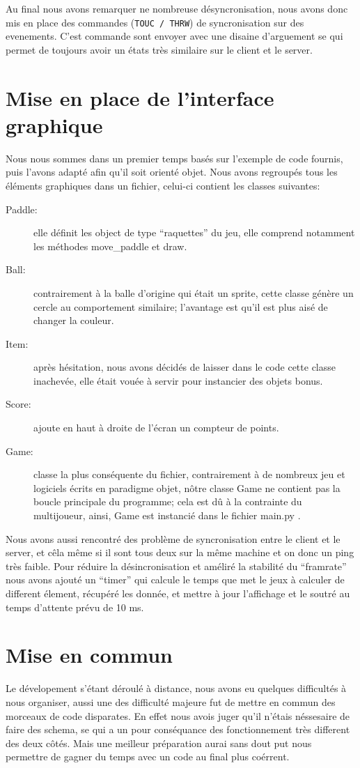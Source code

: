 \documentclass[12pt]{report}
\begin{document}
Au final nous avons remarquer ne nombreuse désyncronisation, nous avons donc
mis en place des commandes (\texttt{TOUC / THRW}) de syncronisation sur des
evenements.
C'est commande sont envoyer avec une disaine d'arguement se qui permet de toujours
avoir un états très similaire sur le client et le server.

\chapter{Mise en place de l'interface graphique}
Nous nous sommes dans un premier temps basés sur l'exemple de code
fournis, puis l'avons adapté afin qu'il soit orienté objet. Nous avons
regroupés tous les éléments graphiques dans un fichier, celui-ci
contient les classes suivantes:

\begin{description}
  \item [Paddle:] elle définit les object de type ``raquettes'' du jeu, elle
    comprend notamment les méthodes move_paddle et draw.
  \item [Ball:] contrairement à la balle d'origine qui était un
    sprite, cette classe génère un cercle au comportement similaire;
    l'avantage est qu'il est plus aisé de changer la couleur.
  \item [Item: ] après hésitation, nous avons décidés de laisser dans
    le code cette classe inachevée, elle était vouée à servir pour
    instancier des objets bonus.
  \item [Score: ] ajoute en haut à droite de l'écran un compteur de
    points.
  \item [Game: ] classe la plus conséquente du fichier,
    contrairement à de nombreux jeu et logiciels écrits en paradigme
    objet, nôtre classe Game ne contient pas la boucle principale du
    programme; cela est dû à la contrainte du multijoueur, ainsi, Game
    est instancié dans le fichier main.py .
\end{description}

Nous avons aussi rencontré des problème de syncronisation entre le client
et le server, et cêla même si il sont tous deux sur la même machine et on
donc un ping très faible.
Pour réduire la désincronisation et améliré la stabilité du ``framrate''
nous avons ajouté un ``timer'' qui calcule le temps que met le jeux à calculer
de different élement, récupéré les donnée, et mettre à jour l'affichage et le
soutré au temps d'attente prévu de 10 ms.

\chapter{Mise en commun}
Le dévelopement s'étant déroulé à distance, nous avons eu quelques
difficultés à nous organiser, aussi une des difficulté majeure fut de
mettre en commun des morceaux de code disparates.
En effet nous avois juger qu'il n'étais néssesaire de faire des
schema, se qui a un pour conséquance des fonctionnement très different
des deux côtés.
Mais une meilleur préparation aurai sans dout put nous
permettre de gagner du temps avec un code au final plus coérrent. 
\end{document}
